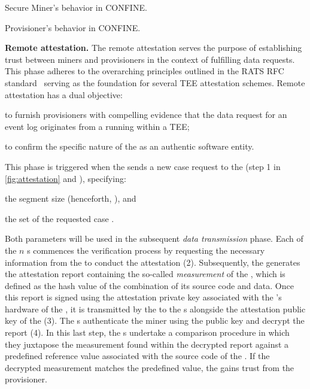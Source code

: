 \begin{algorithm2e}[tb]
	
	\caption{Secure Miner's behavior in CONFINE.}
	\label{alg:secm}
\end{algorithm2e} 
\begin{algorithm2e}[tb]
	
	\caption{Provisioner's behavior in CONFINE.}
	\label{alg:lprv}
\end{algorithm2e} 
%
\noindent\textbf{Remote attestation.} The remote attestation serves the purpose of establishing trust between miners and provisioners in the context of fulfilling data requests. This phase adheres to the overarching principles outlined in the RATS RFC standard~\citep{rfc9334} serving as the foundation for several TEE attestation schemes. Remote attestation has a dual objective:
\begin{inparaenum}
    \item to furnish provisioners with compelling evidence that the data request for an event log originates from a  running within a TEE;
    \item to confirm the specific nature of the  as an authentic  software entity.
\end{inparaenum}
This phase is triggered when the  sends a new case request to the (step 1 in \cref{fig:attestation} and ), specifying:
\begin{inparaenum}
    \item the segment size (henceforth, \SegSize), and
    \item the set of the requested case \CIdS.
\end{inparaenum}
Both parameters will be used in the subsequent \textit{data transmission} phase. Each of the $n$ s commences the verification process by requesting the necessary information from the  to conduct the attestation (2). Subsequently, the  generates the attestation report containing the so-called \emph{measurement} of the , which is defined as the hash value of the combination of its source code and data. Once this report is signed using the attestation private key associated with the 's hardware of the , it is transmitted by the  to the s alongside the attestation public key of the  (3). The s authenticate the miner using the public key and decrypt the report (4). In this last step, the s undertake a comparison procedure in which they juxtapose the measurement found within the decrypted report against a predefined reference value associated with the source code of the . If the decrypted measurement matches the predefined value, the  gains trust from the provisioner.

